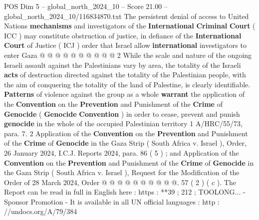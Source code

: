 \begin{textsample}{POS Dim 5 – global\_north\_2024\_10 – Score 21.00 – global\_north\_2024\_10/116834870.txt}
The persistent denial of access to United Nations \textbf{mechanisms} and investigators of the \textbf{International} \textbf{Criminal} \textbf{Court} ( ICC ) may constitute obstruction of justice, in defiance of the \textbf{International} \textbf{Court} of Justice ( ICJ ) order that Israel allow \textbf{international} investigators to enter Gaza @ @ @ @ @ @ @ @ @ @ 2 While the scale and nature of the ongoing Israeli assault against the Palestinians vary by area, the totality of the Israeli \textbf{acts} of destruction directed against the totality of the Palestinian people, with the aim of conquering the totality of the land of Palestine, is clearly identifiable. \textbf{Patterns} of violence against the group as a whole \textbf{warrant} the application of the \textbf{Convention} on the \textbf{Prevention} and Punishment of the \textbf{Crime} of \textbf{Genocide} ( \textbf{Genocide} \textbf{Convention} ) in order to cease, prevent and punish \textbf{genocide} in the whole of the occupied Palestinian territory 1 A/HRC/55/73, para. 7. 2 Application of the \textbf{Convention} on the \textbf{Prevention} and Punishment of the \textbf{Crime} of \textbf{Genocide} in the Gaza Strip ( South Africa v.
Israel ), Order, 26 January 2024, I.C.J.
Reports 2024, para. 86 ( 5 ) ; and Application of the \textbf{Convention} on the \textbf{Prevention} and Punishment of the \textbf{Crime} of \textbf{Genocide} in the Gaza Strip ( South Africa v.
Israel ), Request for the Modification of the Order of 28 March 2024, Order @ @ @ @ @ @ @ @ @ @. 57 ( 2 ) ( c ).
The Report can be read in full in English here : https : **39 ; 212 ; TOOLONG... - Sponsor Promotion - It is available in all UN official languages : http : //undocs.org/A/79/384

\end{textsample}
